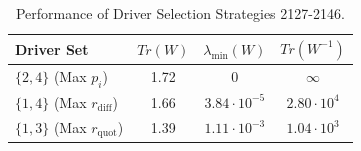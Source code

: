 \documentclass[11pt, a4paper]{article}
\begin{document}
\begin{table}[H]
    \centering
    \caption{Performance of Driver Selection Strategies {2127-2146}.}
    \label{tab:performance_case_study}
    \begin{tabular}{@{}lccc@{}}
        \toprule
        \textbf{Driver Set} & \textbf{$Tr(W)$} & \textbf{$\lambda_{\min}(W)$} & \textbf{$Tr(W^{-1})$} \\ \midrule
        $\{2,4\}$ (Max $p_i$) & 1.72 & 0 & $\infty$ \\
        $\{1,4\}$ (Max $r_{\text{diff}}$) & 1.66 & $3.84 \cdot 10^{-5}$ & $2.80 \cdot 10^4$ \\
        $\{1,3\}$ (Max $r_{\text{quot}}$) & 1.39 & $1.11 \cdot 10^{-3}$ & $1.04 \cdot 10^3$ \\ \bottomrule
    \end{tabular}
\end{table}
\end{document}
